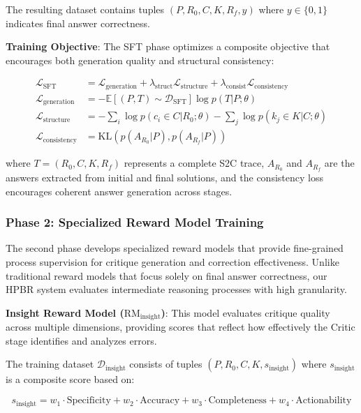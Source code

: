 \documentclass[10pt,twocolumn]{article}
\newcommand{\ssc}{\textsc{S2C}}
\newcommand{\hpbr}{\textsc{HPBR}}
\newcommand{\RMinsight}{\text{RM}_{\text{insight}}}
\newcommand{\expectation}[1]{\mathbb{E}\left[#1\right]}
\begin{document}
The resulting dataset contains tuples $(P, R_0, C, K, R_f, y)$ where $y \in \{0, 1\}$ indicates final answer correctness.

\textbf{Training Objective}: The SFT phase optimizes a composite objective that encourages both generation quality and structural consistency:

\begin{align}
\mathcal{L}_{\text{SFT}} &= \mathcal{L}_{\text{generation}} + \lambda_{\text{struct}} \mathcal{L}_{\text{structure}} + \lambda_{\text{consist}} \mathcal{L}_{\text{consistency}} \\
\mathcal{L}_{\text{generation}} &= -\expectation{(P,T) \sim \mathcal{D}_{\text{SFT}}}{\log p(T | P; \theta)} \\
\mathcal{L}_{\text{structure}} &= -\sum_{i} \log p(c_i \in C | R_0; \theta) - \sum_{j} \log p(k_j \in K | C; \theta) \\
\mathcal{L}_{\text{consistency}} &= \text{KL}(p(A_{R_0} | P), p(A_{R_f} | P))
\end{align}

where $T = (R_0, C, K, R_f)$ represents a complete \ssc{} trace, $A_{R_0}$ and $A_{R_f}$ are the answers extracted from initial and final solutions, and the consistency loss encourages coherent answer generation across stages.

\subsubsection{Phase 2: Specialized Reward Model Training}

The second phase develops specialized reward models that provide fine-grained process supervision for critique generation and correction effectiveness. Unlike traditional reward models that focus solely on final answer correctness, our \hpbr{} system evaluates intermediate reasoning processes with high granularity.

\textbf{Insight Reward Model ($\RMinsight$)}: This model evaluates critique quality across multiple dimensions, providing scores that reflect how effectively the Critic stage identifies and analyzes errors.

The training dataset $\mathcal{D}_{\text{insight}}$ consists of tuples $(P, R_0, C, K, s_{\text{insight}})$ where $s_{\text{insight}}$ is a composite score based on:

\begin{equation}
s_{\text{insight}} = w_1 \cdot \text{Specificity} + w_2 \cdot \text{Accuracy} + w_3 \cdot \text{Completeness} + w_4 \cdot \text{Actionability}
\end{equation}
\end{document}
